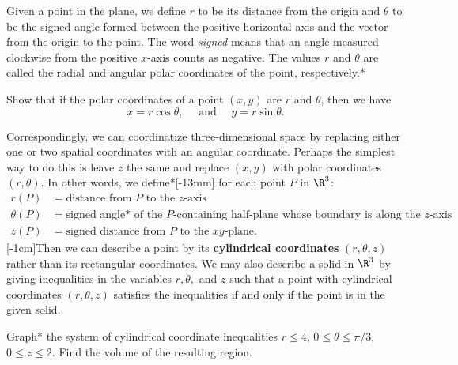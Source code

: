 \documentclass[indent]{watsonbook}
\begin{document}
{Given a point in the plane, we define $r$ to be its distance from the
origin and $\theta$ to be the signed angle formed between the positive
horizontal axis and the vector from the origin to the point. The word
\textit{signed} means that an angle measured clockwise from the
positive $x$-axis counts as negative. The values $r$ and $\theta$ are
called the radial and angular polar coordinates of the point,
respectively.* 

\begin{exercise}{}{}
  Show that if the polar coordinates of a point $(x,y)$ are $r$ and
  $\theta$, then we have
  \[
    x = r\cos \theta, \quad \text { and } \quad y  = r\sin \theta.
  \]
\end{exercise}

Correspondingly, we can coordinatize three-dimensional space by
replacing either one or two spatial coordinates with an angular
coordinate. Perhaps the simplest way to do this is leave $z$ the same
and replace $(x,y)$ with polar coordinates $(r,\theta)$. In other
words, we define*[-13mm] for each point
$P$ in $\R^3$:
\begin{align*}
  r(P) &= \text{distance from $P$ to the }z\text{-axis} \\
  \theta(P) &= \text{signed angle* of the $P$-containing half-plane
              whose boundary is along the $z$-axis} \\
  z(P) &= \text{signed distance from $P$ to the }xy\text{-plane}.
\end{align*} [-1cm]Then we can describe a point by its
\textbf{cylindrical coordinates} $(r,\theta, z)$ rather than its
rectangular coordinates. We may also describe a solid in $\R^3$
by giving inequalities in the variables $r, \theta,$ and $z$ such that
a point with cylindrical coordinates
$(r,\theta,z)$
satisfies the inequalities if and only if the point is in the given solid.

\begin{example}{}{}
  Graph* the system of cylindrical coordinate inequalities $r \leq 4$,
  \quad $0 \leq \theta \leq \pi/3$, \quad $0 \leq z \leq 2$. Find the
  volume of the resulting region. 
\end{example}

}
\end{document}
